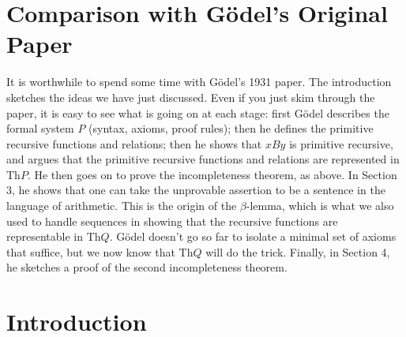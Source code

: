 \documentclass[10pt,a4paper]{article}
\theoremstyle{plain}
\theoremstyle{definition}
\theoremstyle{remark}
\newcommand*{\olfileid}[3]{}
\newcommand*{\olsection}[1]{\section*{#1}}
\newcommand*{\olchapter}[3]{}
\newcommand*{\olimport}[1]{}
\providecommand{\Th}{\ensuremath{\mathrm{Th}}}
\begin{document}
\olfileid{inc}{inp}{gop}

\olsection{Comparison with G\"odel's Original Paper}

It is worthwhile to spend some time with G\"odel's 1931
paper. The introduction sketches the ideas we have just discussed.
Even if you just skim through the paper, it is easy to see what is
going on at each stage: first G\"odel describes the formal system $P$
(syntax, axioms, proof rules); then he defines the primitive recursive
functions and relations; then he shows that $x B y$ is primitive
recursive, and argues that the primitive recursive functions and
relations are represented in $\Th{P}$. He then goes on to prove the
incompleteness theorem, as above. In Section 3, he shows that one can
take the unprovable assertion to be a sentence in the language of
arithmetic. This is the origin of the $\beta$-lemma, which is what we
also used to handle sequences in showing that the recursive functions
are representable in $\Th{Q}$. G\"odel doesn't go so far to isolate a
minimal set of axioms that suffice, but we now know that $\Th{Q}$ will do
the trick.  Finally, in Section 4, he sketches a proof of the second
incompleteness theorem.





\olchapter{inc}{inp}{Incompleteness and Provability}

\olimport{introduction}

\olimport{fixed-point-lemma}

\olimport{first-incompleteness-thm}

\olimport{rosser-thm}

\olimport{godels-paper}

\olimport{provability-conditions}

\olimport{second-incompleteness-thm}

\olimport{lob-thm}

\olimport{tarski-thm}

\OLEndChapterHook





\olfileid{inc}{inp}{int}

\olsection{Introduction}
\end{document}
